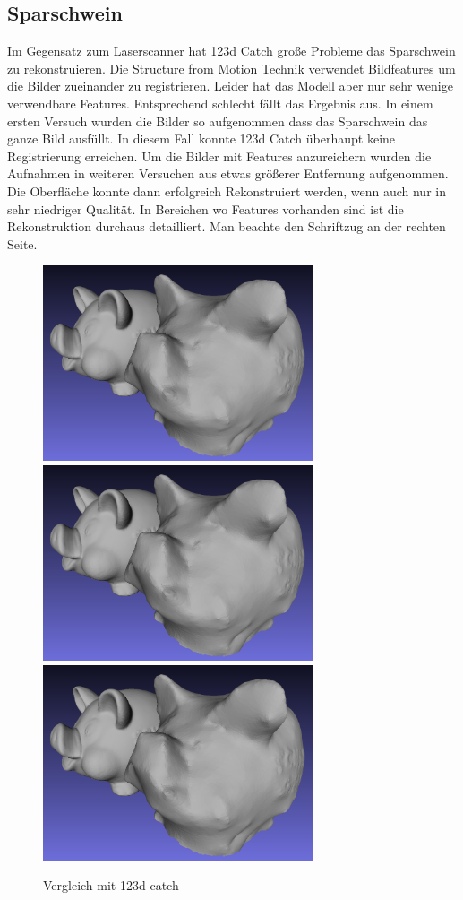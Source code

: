 \documentclass[]{article}
\begin{document}
\subsection{Sparschwein}
Im Gegensatz zum Laserscanner hat 123d Catch große Probleme das Sparschwein zu rekonstruieren. Die Structure from Motion Technik verwendet Bildfeatures um die Bilder zueinander zu registrieren. Leider hat das Modell aber nur sehr wenige verwendbare Features. Entsprechend schlecht fällt das Ergebnis aus. In einem ersten Versuch wurden die Bilder so aufgenommen dass das Sparschwein das ganze Bild ausfüllt. In diesem Fall konnte 123d Catch überhaupt keine Registrierung erreichen. Um die Bilder mit Features anzureichern wurden die Aufnahmen in weiteren Versuchen aus etwas größerer Entfernung aufgenommen. Die Oberfläche konnte dann erfolgreich Rekonstruiert werden, wenn auch nur in sehr niedriger Qualität. In Bereichen wo Features vorhanden sind ist die Rekonstruktion durchaus detailliert. Man beachte den Schriftzug an der rechten Seite.

\begin{figure}[p]
\caption{Vergleich mit 123d catch}
\centering
\includegraphics[width=80mm]{images/sparschwein/123d_Vergleich} %
\includegraphics[width=80mm]{images/sparschwein/123d_Vergleich} %
\includegraphics[width=80mm]{images/sparschwein/123d_Vergleich}
\end{figure}
\end{document}
